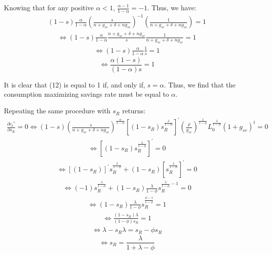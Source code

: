 \documentclass[11pt]{article} %
\begin{document}
\par Knowing that for any positive $\alpha < 1$, $\frac{\alpha-1}{1-\alpha} = -1$. Thus, we have:
\begin{align*}
    (1-s) \frac{\alpha}{1-\alpha}\left(\frac{s}{n+g_{se}+\delta+ng_{se}}\right)^{-1}
    \left(\frac{1}{n+g_{se}+\delta+ng_{se}}\right)
    =1
\end{align*}
\begin{align*}
    \Longleftrightarrow
    (1-s) \frac{\alpha}{1-\alpha}\frac{n+g_{se}+\delta+ng_{se}}{s}
    \frac{1}{n+g_{se}+\delta+ng_{se}}
    =1
\end{align*}
\begin{align*}
    \Longleftrightarrow
    (1-s) \frac{\alpha}{1-\alpha} \frac{1}{s}=1
\end{align*}
\begin{equation}
    \Longleftrightarrow
    \frac{\alpha(1-s)}{(1-\alpha)s}=1
\end{equation}

\par It is clear that (12) is equal to 1 if, and only if, $s = \alpha$. Thus, we find that the consumption maximizing savings rate must be equal to $\alpha$.

\par Repeating the same procedure with $s_R$ returns:
\begin{align*}
    \frac{\partial{c_t}^*}{\partial{s_R}} = 0
    \Longleftrightarrow (1-s)\left(\frac{s}{n+g_{se}+\delta+ng_{se}}\right)^{\frac{\alpha}{1-\alpha}}\left[(1-s_{R})s_R^{\frac{\lambda}{1-\phi}}\right]^{'}\left(\frac{\rho}{g_{se}} \right)^{\frac{1}{1-\phi}}L_0^{\frac{\lambda}{1-\phi}}(1+g_{se})^t=0
\end{align*}
\begin{align*}
    \Longleftrightarrow
    \left[(1-s_{R})s_R^{\frac{\lambda}{1-\phi}}\right]^{'} 
    = 0
\end{align*}
\begin{align*}
    \Longleftrightarrow
    \left[(1-s_{R})\right]^{'} s_R^{\frac{\lambda}{1-\phi}}
    + (1-s_{R}) \left[s_R^{\frac{\lambda}{1-\phi}}\right]^{'}
    = 0
\end{align*}
\begin{align*}
    \Longleftrightarrow
    (-1)s_R^{\frac{\lambda}{1-\phi}}
    + (1-s_{R}) \frac{\lambda}{1-\phi} s_R^{\frac{\lambda}{1-\phi}-1}
    = 0
\end{align*}
\begin{align*}
    \Longleftrightarrow
    (1-s_{R}) \frac{\lambda}{1-\phi} s_R^{\frac{\phi-1}{1-\phi}}
    = 1
\end{align*}
\begin{align*}
    \Longleftrightarrow
    \frac{(1-s_{R})\lambda}{(1-\phi)s_R}
    = 1
\end{align*}
\begin{align*}
    \Longleftrightarrow
    \lambda-s_R\lambda
    = s_R-\phi s_R
\end{align*}
\begin{equation}
    \Longleftrightarrow
    s_R = \frac{\lambda}{1+\lambda-\phi}
\end{equation}
\end{document}
